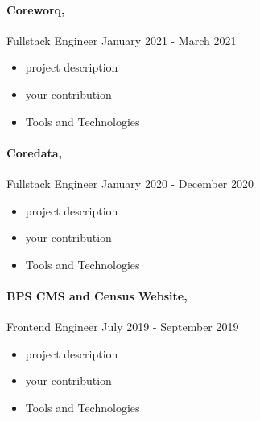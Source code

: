 \documentclass{article}
\begin{document}
\paragraph{Coreworq,} Fullstack Engineer \hfill January 2021 - March 2021
\vspace{-0.5em}
\begin{itemize}
    \setlength{\itemsep}{-0.3em}
    \item project description
    \item your contribution
    \item Tools and Technologies
\end{itemize}
\vspace{-2em}
\paragraph{Coredata,} Fullstack Engineer \hfill January 2020 - December 2020
\vspace{-0.5em}
\begin{itemize}
    \setlength{\itemsep}{-0.3em}
    \item project description
    \item your contribution
    \item Tools and Technologies
\end{itemize}
\vspace{-2em}
\paragraph{BPS CMS and Census Website,} Frontend Engineer \hfill July 2019 - September 2019
\vspace{-0.5em}
\begin{itemize}
    \setlength{\itemsep}{-0.3em}
    \item project description
    \item your contribution
    \item Tools and Technologies
\end{itemize}
\end{document}
